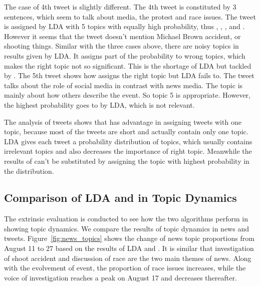 The case of 4th tweet is slightly different. The 4th tweet is constituted by 3 sentences, which seem to talk about media, the protest and race issues. The tweet is assigned by LDA with 5 topics with equally high probability, thus \protest, \michaelbrown, \shootincident, \emotion and \raceandcommunity. However it seems that the tweet doesn't mention Michael Brown accident, or shooting things. Similar with the three cases above, there are noisy topics in results given by LDA. It assigns part of the probability to wrong topics, which makes the right topic not so significant. This is the shortage of LDA but tackled by \stlda.
The 5th tweet shows how \stlda assigns the right topic but LDA fails to. The tweet talks about the role of social media in contrast with news media. The topic is mainly about how others describe the event. So topic 5 \newsreport is appropriate. However, the highest probability goes to \obamatalk by LDA, which is not relevant.

The analysis of tweets shows that \stlda has advantage in assigning tweets with one topic, because most of the tweets are short and actually contain only one topic. LDA gives each tweet a probability distribution of topics, which usually contains irrelevant topics and also decreases the importance of right topic. Meanwhile the results of \stlda can't be substituted by assigning the topic with highest probability in the distribution.

\subsection{Comparison of LDA and \stlda in Topic Dynamics}
\label{subsec:extrinsic}

The extrinsic evaluation is conducted to see how the two algorithms perform in showing topic dynamics. We compare the results of topic dynamics in news and tweets. Figure~\ref{fig:news_topics} shows the change of news topic proportions from August 11 to 27 based on the results of LDA and \stlda. It is similar that investigation of shoot accident and discussion of race are the two main themes of news. Along with the evolvement of event, the proportion of race issues increases, while the voice of investigation reaches a peak on August 17 and decreases thereafter.


